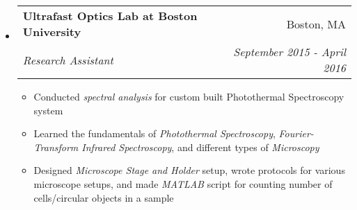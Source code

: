 \documentclass[letterpaper, 8pt]{extarticle}
\makeatletter
\newcommand{\resitem}[1]{\item #1 \vspace{-2pt}}
\newcommand{\ressubheading}[4]{
\begin{tabular*}{7.40in}{l@{\extracolsep{\fill}}r}
		\textbf{#1} & #2 \\
		\textit{#3} & \textit{#4} \\
\end{tabular*}\vspace{-6pt}}
\makeatother
\begin{document}
\begin{itemize}
\begin{itemize}
	\end{itemize}
\item
	\ressubheading{Ultrafast Optics Lab at Boston University}{Boston, MA}{Research Assistant}{September 2015 - April 2016}
	\begin{itemize}
	    \resitem{Conducted \emph{spectral analysis} for custom built Photothermal Spectroscopy system}
	    \resitem{Learned the fundamentals of \emph{Photothermal Spectroscopy}, \emph{Fourier-Transform Infrared Spectroscopy}, and different types of \emph{Microscopy} }
	    \resitem{Designed \emph{Microscope Stage and Holder} setup, wrote protocols for various microscope setups, and made \emph{MATLAB} script for counting number of cells/circular objects in a sample}
	\end{itemize}


\end{itemize}
\end{document}
